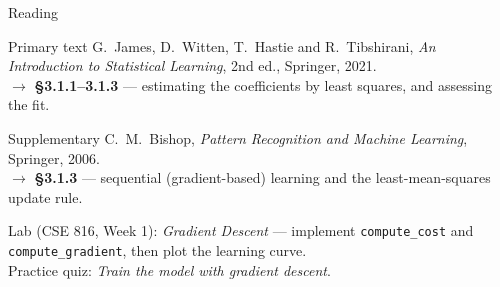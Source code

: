 \documentclass[aspectratio=169,10pt]{beamer}
\begin{document}
\begin{frame}{Reading}
  \begin{block}{Primary text}
    G.~James, D.~Witten, T.~Hastie and R.~Tibshirani,
    \emph{An Introduction to Statistical Learning}, 2nd ed., Springer, 2021.\\[2pt]
    \hfill{\small$\rightarrow$ \textbf{\S3.1.1--3.1.3} --- estimating the coefficients by
    least squares, and assessing the fit.}
  \end{block}
  \begin{block}{Supplementary}
    C.~M.~Bishop, \emph{Pattern Recognition and Machine Learning}, Springer, 2006.\\[2pt]
    \hfill{\small$\rightarrow$ \textbf{\S3.1.3} --- sequential (gradient-based) learning and the
    least-mean-squares update rule.}
  \end{block}
  \vspace{2mm}
  \begin{center}
    \small\color{cugray}
    Lab (CSE 816, Week 1): \emph{Gradient Descent} --- implement
    \texttt{compute\_cost} and \texttt{compute\_gradient}, then plot the learning
    curve.\\
    Practice quiz: \emph{Train the model with gradient descent}.
  \end{center}
\end{frame}
\end{document}
